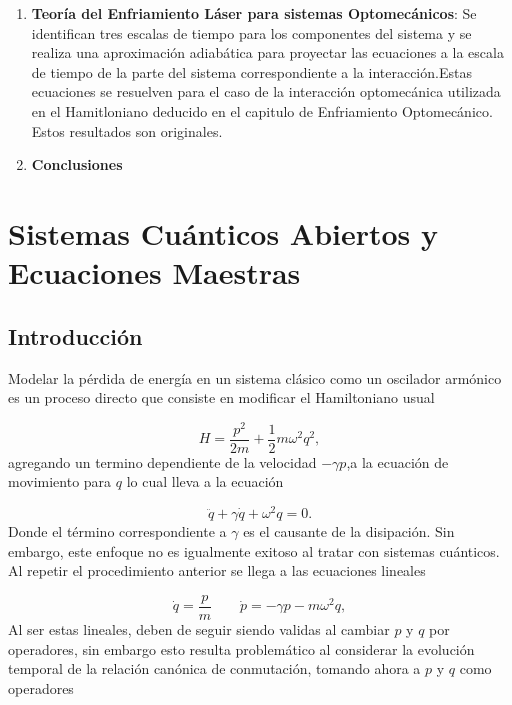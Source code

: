 \documentclass[a4paper,10pt]{report}
\begin{document}
\begin{enumerate}
\item \textbf{Teoría del Enfriamiento Láser para sistemas Optomecánicos}: Se identifican tres escalas de tiempo para los componentes del sistema y se realiza una aproximación adiabática para proyectar las ecuaciones a la escala de tiempo de la parte del sistema correspondiente a la interacción.Estas ecuaciones se resuelven para el caso de la interacción optomecánica utilizada en el Hamitloniano deducido en el capitulo de Enfriamiento Optomecánico. Estos resultados son originales.

\item \textbf{Conclusiones}

\end{enumerate}

\chapter{Sistemas Cuánticos Abiertos y Ecuaciones Maestras}

\section{Introducción}

Modelar la pérdida de energía en un sistema clásico como un oscilador armónico es un proceso directo \cite{CarmichaelQO} que consiste en modificar el Hamiltoniano usual

\begin{equation}
H = \frac{p^2}{2m} + \frac{1}{2} m\omega^2 q^2,
\end{equation} agregando un termino dependiente de la velocidad $-\gamma p$,a la ecuación de movimiento para $q$ lo cual lleva a la ecuación

\begin{equation}
\ddot{q} + \gamma \dot{q} + \omega^2 q = 0.
\end{equation}Donde el término correspondiente a $\gamma$ es el causante de la disipación. Sin embargo, este enfoque no es igualmente exitoso al tratar con sistemas cuánticos. Al repetir el procedimiento anterior se llega a las ecuaciones lineales

\begin{equation}
\dot{q} = \frac{p}{m} \qquad \dot{p} = -\gamma p -m\omega ^2 q,
\end{equation}Al ser estas lineales, deben de seguir siendo validas al cambiar $p$ y $q$ por operadores, sin embargo esto resulta problemático al considerar la evolución temporal de la relación canónica de conmutación, tomando ahora a $p$ y $q$ como operadores
\end{document}
